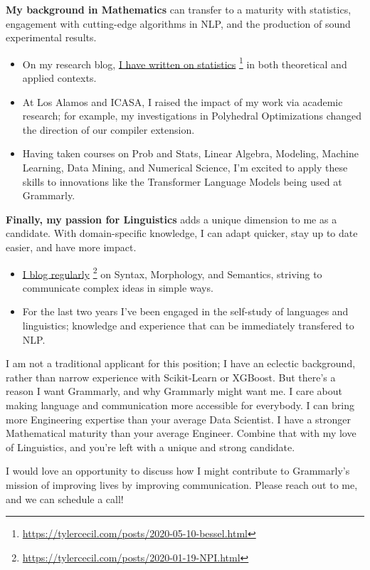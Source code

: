 \documentclass[sans, a4paper]{article}
\newcommand{\cvcolor}[1]{{\color{MidnightBlue}#1}}
\renewcommand{\hl}[1]{\cvcolor{\textbf{#1}}}
\renewcommand{\cite}[2]{\href{#2}{\ul{#1}} \footnote{\href{#2}{#2}}}
\begin{document}
\begin{adjustwidth}{40pt}{40pt}
  \hl{My background in Mathematics} can transfer to a maturity with statistics,
  engagement with cutting-edge algorithms in NLP, and the production of sound
  experimental results.
  \begin{itemize}
    \item On my research blog, \cite{I have written on statistics}
      {https://tylercecil.com/posts/2020-05-10-bessel.html}
      in both theoretical and applied contexts.
    \item At Los Alamos and ICASA, I raised the impact of my work via academic
      research; for example, my investigations in Polyhedral Optimizations
      changed the direction of our compiler extension.
    \item Having taken courses on Prob and Stats, Linear Algebra, Modeling,
      Machine Learning, Data Mining, and Numerical Science, I'm excited to
      apply these skills to innovations like the Transformer Language Models
      being used at Grammarly.
  \end{itemize} \medskip

  \hl{Finally, my passion for Linguistics} adds a unique dimension to me as a
  candidate. With domain-specific knowledge, I can adapt quicker, stay up to
  date easier, and have more impact.
  \begin{itemize}
    \item \cite{I blog
      regularly}{https://tylercecil.com/posts/2020-01-19-NPI.html} on Syntax,
      Morphology, and Semantics, striving to communicate complex ideas in
      simple ways.
    \item  For the last two years I've been engaged in the self-study of
      languages and linguistics; knowledge and experience that can be
      immediately transfered to NLP.
  \end{itemize}\medskip

  I am not a traditional applicant for this position; I have an eclectic
  background, rather than narrow experience with Scikit-Learn or XGBoost.  But
  there's a reason I want Grammarly, and why Grammarly might want me. I care
  about making language and communication more accessible for everybody. I can
  bring more Engineering expertise than your average Data Scientist. I have a
  stronger Mathematical maturity than your average Engineer. Combine that with
  my love of Linguistics, and you're left with a unique and strong candidate.
  \medskip

  I would love an opportunity to discuss how I might contribute to Grammarly's
  mission of improving lives by improving communication. Please reach out to
  me, and we can schedule a call!  \bigskip


\end{adjustwidth}
\end{document}
